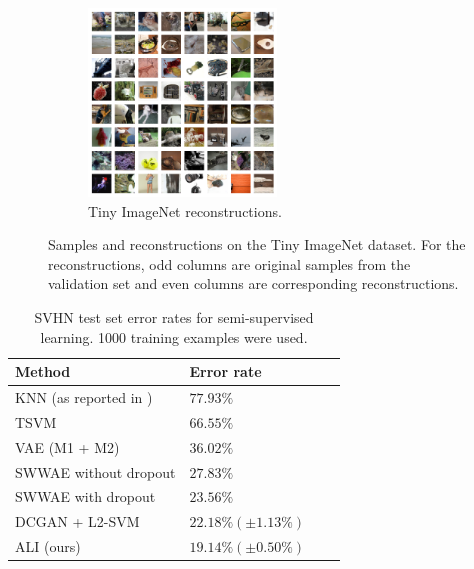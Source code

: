 \documentclass{article}
\newcommand{\figureHeight}{5cm}
\begin{document}
\begin{figure}[t]
\begin{subfigure}[t]{0.49\textwidth}
        \includegraphics[height=\figureHeight]{tiny_imagenet_reconstructions.png}
        \caption{\label{fig:tiny_imagenet_reconstructions} Tiny ImageNet
            reconstructions.}
    \end{subfigure}
    \caption{\label{fig:tiny_imagenet_images} Samples and reconstructions on the
        Tiny ImageNet dataset. For the reconstructions, odd columns are original
        samples from the validation set and even columns are corresponding
        reconstructions.}
\end{figure}

\begin{table}[t]
\centering
\begin{tabular}{@{}llll@{}} \toprule
Method                                         & Error rate                      \\ \midrule
KNN (as reported in \citet{zhao2015stacked})   & $77.93\%$                       \\
TSVM \citep{vapnik1998}                        & $66.55\%$                       \\
VAE (M1 + M2) \citep{kingma2014semi}           & $36.02\%$                       \\
SWWAE without dropout \citep{zhao2015stacked}  & $27.83\%$                       \\
SWWAE with dropout \citep{zhao2015stacked}     & $23.56\%$                       \\
DCGAN + L2-SVM \citep{radford2015unsupervised} & $22.18\% (\pm 1.13\%)$          \\ \midrule
ALI (ours)                                     & $\mathbf{19.14\% (\pm 0.50\%)}$ \\
\bottomrule
\end{tabular}
\vspace{0.2cm}
\caption{\label{tab:semi-supervised} SVHN test set error rates for
	semi-supervised learning. 1000 training examples were used.}
\end{table}
\end{document}
